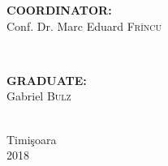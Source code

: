 \documentclass[12pt, a4paper]{report}
\begin{document}
\begin{titlepage}

\begin{minipage}{0.4\textwidth}
\begin{flushleft} \large
\textbf{COORDINATOR:}\\
Conf. Dr. Marc Eduard \textsc{Fr\^incu} %
\end{flushleft}
\end{minipage}
~
\begin{minipage}{0.4\textwidth}
\begin{flushright} \large
\textbf{GRADUATE:} \\
Gabriel \textsc{Bulz} %
\end{flushright}
\end{minipage}\\[1cm]


\vfill
{\large Timi\c{s}oara \\2018}\\ %

 


\end{titlepage}


\end{document}
